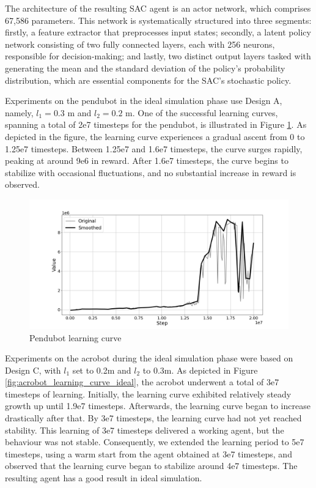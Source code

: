 The architecture of the resulting SAC agent is an actor network, which comprises 67,586 parameters. This network is systematically structured into three segments: firstly, a feature extractor that preprocesses input states; secondly, a latent policy network consisting of two fully connected layers, each with 256 neurons, responsible for decision-making; and lastly, two distinct output layers tasked with generating the mean and the standard deviation of the policy's probability distribution, which are essential components for the SAC's stochastic policy.

Experiments on the pendubot in the ideal simulation phase use Design A, namely, \( l_1 = 0.3 \) m and \( l_2 = 0.2 \) m. One of the successful learning curves, spanning a total of 2e7 timesteps for the pendubot, is illustrated in Figure \ref{fig:pendubot_learning_curve_ideal}. As depicted in the figure, the learning curve experiences a gradual ascent from 0 to 1.25e7 timesteps. Between 1.25e7 and 1.6e7 timesteps, the curve surges rapidly, peaking at around 9e6 in reward. After 1.6e7 timesteps, the curve begins to stabilize with occasional fluctuations, and no substantial increase in reward is observed.

\begin{figure}[H]
    \centering
    \includegraphics[width=1.1\textwidth]{figures/learning_curve/pendubot_learning_curve_redraw.png} %
    \caption{Pendubot learning curve}
    \label{fig:pendubot_learning_curve_ideal}
\end{figure}

Experiments on the acrobot during the ideal simulation phase were based on Design C, with \( l_1 \) set to 0.2m and \( l_2 \) to 0.3m. As depicted in Figure \ref{fig:acrobot_learning_curve_ideal}, the acrobot underwent a total of 3e7 timesteps of learning. Initially, the learning curve exhibited relatively steady growth up until 1.9e7 timesteps. Afterwards, the learning curve began to increase drastically after that. By 3e7 timesteps, the learning curve had not yet reached stability. This learning of 3e7 timesteps delivered a working agent, but the behaviour was not stable. Consequently, we extended the learning period to 5e7 timesteps, using a warm start from the agent obtained at 3e7 timesteps, and observed that the learning curve began to stabilize around 4e7 timesteps. The resulting agent has a good result in ideal simulation.

